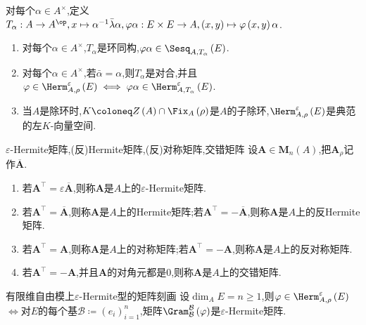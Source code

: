 \begin{remark}{}{}
	对每个$\alpha\in A^{\times}$,定义$T_{\alpha}:A\to A^{\op},x\mapsto\alpha^{-1}\bar{\lambda}\alpha,\varphi\alpha:E\times E\to A,\left(x,y\right)\mapsto\varphi\left(x,y\right)\alpha$.
	\begin{enumerate}
		\item 对每个$\alpha\in A^{\times}$,$T_{\alpha}$是环同构,$\varphi\alpha\in\Sesq_{A,T_{\alpha}}\left(E\right)$.
		\item 对每个$\alpha\in A^{\times}$,若$\bar{\alpha}=\alpha$,则$T_{\alpha}$是对合,并且$\varphi\in\Herm_{A,\rho}^{\varepsilon}\left(E\right)\iff\varphi\alpha\in\Herm_{A,T_{\alpha}}^{\varepsilon}\left(E\right)$.
		\item 当$A$是除环时,$K\coloneq Z\left(A\right)\cap\Fix_{A}\left(\rho\right)$是$A$的子除环,$\Herm_{A,\rho}^{\varepsilon}\left(E\right)$是典范的左$K$-向量空间.
	\end{enumerate}
\end{remark}

\begin{definition}{$\varepsilon$-Hermite矩阵,(反)Hermite矩阵,(反)对称矩阵,交错矩阵}{}
	设$\boldsymbol{A}\in\mathbf{M}_{n}\left(A\right)$,把$\boldsymbol{A}_{\rho}$记作$\overline{\boldsymbol{A}}$.
	\begin{enumerate}
		\item 若$\boldsymbol{A}^{\top}=\varepsilon\overline{\boldsymbol{A}}$,则称$\boldsymbol{A}$是$A$上的$\varepsilon$-Hermite矩阵.
		\item 若$\boldsymbol{A}^{\top}=\overline{\boldsymbol{A}}$,则称$\boldsymbol{A}$是$A$上的Hermite矩阵;若$\boldsymbol{A}^{\top}=-\overline{\boldsymbol{A}}$,则称$\boldsymbol{A}$是$A$上的反Hermite矩阵.
		\item 若$\boldsymbol{A}^{\top}=\boldsymbol{A}$,则称$\boldsymbol{A}$是$A$上的对称矩阵;若$\boldsymbol{A}^{\top}=-\boldsymbol{A}$,则称$\boldsymbol{A}$是$A$上的反对称矩阵.
		\item 若$\boldsymbol{A}^{\top}=-\boldsymbol{A}$,并且$\boldsymbol{A}$的对角元都是$0$,则称$\boldsymbol{A}$是$A$上的交错矩阵.
	\end{enumerate}
\end{definition}

\begin{proposition}{有限维自由模上$\varepsilon$-Hermite型的矩阵刻画}{}
	设$\dim_{A}E=n\geq 1$,则$\varphi\in\Herm_{A,\rho}^{\varepsilon}\left(E\right)$ $\iff$对$E$的每个基$\mathcal{B}\coloneq\left(e_{i}\right)_{i=1}^{n}$,矩阵$\Gram_{\mathcal{B}}^{\mathcal{B}}\left(\varphi\right)$是$\varepsilon$-Hermite矩阵.
\end{proposition}


